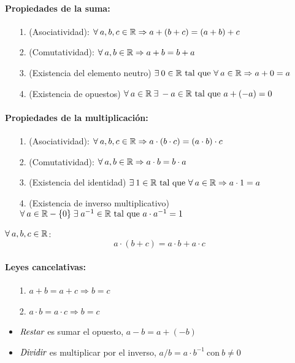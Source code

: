 
\paragraph{Propiedades de la suma:}
\begin{itemize}
    \item[1.] (Asociatividad): $\forall \: a, b, c \in {\mathbb{R}} \Rightarrow a + (b + c) = (a + b) + c$
    \item[2.] (Comutatividad): $\forall \: a, b \in {\mathbb{R}} \Rightarrow a + b = b + a$
    \item[3.] (Existencia del elemento neutro) $\exists \: 0 \in {\mathbb{R}} \text{ tal que } \forall \: a \in {\mathbb{R}} \Rightarrow a + 0 = a$
    \item[4.] (Existencia de opuestos) $\forall \: a \in {\mathbb{R}} \: \exists \: -a \in {\mathbb{R}} \text{ tal que } a + (-a) = 0$   
\end{itemize}

\paragraph{Propiedades de la multiplicación:}
\begin{itemize}
    \item[1.] (Asociatividad): $\forall \: a, b, c \in {\mathbb{R}} \Rightarrow a \cdot (b \cdot c) = (a \cdot b) \cdot c$
    \item[2.] (Comutatividad): $\forall \: a, b \in {\mathbb{R}} \Rightarrow a \cdot b = b \cdot a$
    \item[3.] (Existencia del identidad) $\exists \: 1 \in {\mathbb{R}} \text{ tal que } \forall \: a \in {\mathbb{R}} \Rightarrow a \cdot 1 = a$
    \item[4.] (Existencia de inverso multiplicativo) $\forall \: a \in {\mathbb{R}}-\{0\} \; \exists \; a^{-1} \in {\mathbb{R}} \text{ tal que } a \cdot a^{-1} = 1$
\end{itemize} 

$\forall \: a, b, c \in {\mathbb{R}}$:
$$a \cdot (b+c) = a \cdot b + a \cdot c$$

\paragraph{Leyes cancelativas:}
\begin{itemize}
    \item[1.] $a+b = a+c \Rightarrow b = c$
    \item[2.] $a \cdot b = a \cdot c \Rightarrow b = c$
    \item $\emph{Restar}$ es sumar el opuesto, $a-b = a + (-b)$
    \item $\emph{Dividir}$ es multiplicar por el inverso, $a/b = a \cdot b^{-1} \: \text{con}\: b \neq 0$
\end{itemize} 


